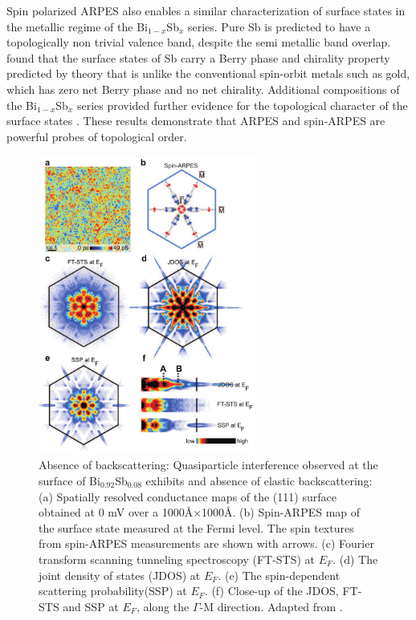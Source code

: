 \documentclass[twocolumn,floatfix,showpacs,rmp,aps]{revtex4}
\begin{document}
	Spin polarized ARPES also enables a similar characterization of
	surface states in the metallic regime of
	the Bi$_{1-x}$Sb$_x$ series.  Pure Sb is predicted to have a topologically non
	trivial valence band, despite the semi metallic band overlap.
	\textcite{hsieh09a} found that the surface states of Sb carry
	a Berry phase and chirality property predicted by theory \cite{teofukane08}
	that is unlike the conventional spin-orbit metals such as gold, which has
	zero net Berry phase and no net chirality.
	Additional compositions of the Bi$_{1-x}$Sb$_x$ series provided further
	evidence for the topological character of the surface states \cite{nishide10}.
	These results demonstrate that ARPES and spin-ARPES are powerful probes of topological
	order.
	
	\begin{figure}
		\includegraphics[width=2.8in]{Fig11}
		\caption{ Absence of backscattering:
			Quasiparticle interference observed at the surface of Bi$_{0.92}$Sb$_{0.08}$
			exhibits and
			absence of elastic backscattering: (a) Spatially resolved conductance
			maps of the (111) surface obtained at 0 mV
			over a 1000\AA$\times$1000\AA. (b) Spin-ARPES map of the
			surface state measured at the Fermi level. The spin textures from
			spin-ARPES measurements are shown with arrows. (c) Fourier transform
			scanning tunneling spectroscopy (FT-STS) at $E_F$. (d) The joint
			density of states (JDOS) at $E_F$. (e) The spin-dependent scattering
			probability(SSP) at $E_F$. (f) Close-up of the JDOS, FT-STS
			and SSP at $E_F$, along the $\Gamma$-M direction.  Adapted from
			.}
		\label{fig:zfig3}
	\end{figure}
	
\end{document}
